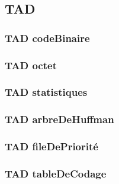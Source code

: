\subsection{TAD}

\subsubsection{TAD codeBinaire}


\subsubsection{TAD octet}


\subsubsection{TAD statistiques}


\subsubsection{TAD arbreDeHuffman}


\subsubsection{TAD fileDePriorité}


\subsubsection{TAD tableDeCodage}

